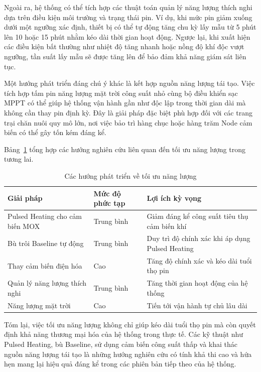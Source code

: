 Ngoài ra, hệ thống có thể tích hợp các thuật toán quản lý năng lượng thích nghi dựa trên điều kiện môi trường và trạng thái pin. Ví dụ, khi mức pin giảm xuống dưới một ngưỡng xác định, thiết bị có thể tự động tăng chu kỳ lấy mẫu từ 5 phút lên 10 hoặc 15 phút nhằm kéo dài thời gian hoạt động. Ngược lại, khi xuất hiện các điều kiện bất thường như nhiệt độ tăng nhanh hoặc nồng độ khí độc vượt ngưỡng, tần suất lấy mẫu sẽ được tăng lên để bảo đảm khả năng giám sát liên tục.

Một hướng phát triển đáng chú ý khác là kết hợp nguồn năng lượng tái tạo. Việc tích hợp tấm pin năng lượng mặt trời công suất nhỏ cùng bộ điều khiển sạc MPPT có thể giúp hệ thống vận hành gần như độc lập trong thời gian dài mà không cần thay pin định kỳ. Đây là giải pháp đặc biệt phù hợp đối với các trang trại chăn nuôi quy mô lớn, nơi việc bảo trì hàng chục hoặc hàng trăm Node cảm biến có thể gây tốn kém đáng kể.

Bảng~\ref{tab:energy_future} tổng hợp các hướng nghiên cứu liên quan đến tối ưu năng lượng trong tương lai.

\begin{table}[H]
\centering
\caption{Các hướng phát triển về tối ưu năng lượng}
\label{tab:energy_future}
\begin{tabular}{p{5cm} p{4cm} p{5cm}}
\hline
\textbf{Giải pháp} &
\textbf{Mức độ phức tạp} &
\textbf{Lợi ích kỳ vọng} \\
\hline
Pulsed Heating cho cảm biến MOX &
Trung bình &
Giảm đáng kể công suất tiêu thụ cảm biến khí \\

Bù trôi Baseline tự động &
Trung bình &
Duy trì độ chính xác khi áp dụng Pulsed Heating \\

Thay cảm biến điện hóa &
Cao &
Tăng độ chính xác và kéo dài tuổi thọ pin \\

Quản lý năng lượng thích nghi &
Trung bình &
Tăng thời gian hoạt động của hệ thống \\

Năng lượng mặt trời &
Cao &
Tiến tới vận hành tự chủ lâu dài \\
\hline
\end{tabular}
\end{table}

Tóm lại, việc tối ưu năng lượng không chỉ giúp kéo dài tuổi thọ pin mà còn quyết định khả năng thương mại hóa của hệ thống trong thực tế. Các kỹ thuật như Pulsed Heating, bù Baseline, sử dụng cảm biến công suất thấp và khai thác nguồn năng lượng tái tạo là những hướng nghiên cứu có tính khả thi cao và hứa hẹn mang lại hiệu quả đáng kể trong các phiên bản tiếp theo của hệ thống.

